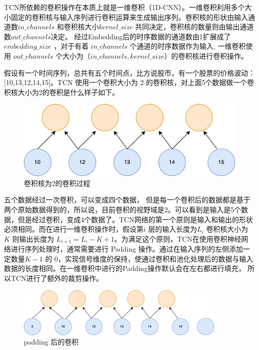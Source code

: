 TCN所依赖的卷积操作在本质上就是一维卷积（1D-CNN）。一维卷积利用多个大小固定的卷积核与输入序列进行卷积运算来生成输出序列。卷积核的形状由输入通道数$in\_channels$ 和卷积核大小$kernel\_size$ 共同决定，卷积核的数量则由输出通道数$out\_channels$决定。
经过Embedding后的时序数据的通道数由1扩展成了$embedding\_size$ ，对于有着 $in\_channels$ 个通道的时序数据作为输入, 一维卷积使用 $out\_channels$ 个大小为（$in\_channels, kernel\_size$）的卷积核进行卷积操作。

假设有一个时间序列，总共有五个时间点，比方说股市，有一个股票的价格波动：[10,13,12,14,15]。TCN 使用一个卷积大小为 2 的卷积核，对上面5个数据做一个卷积核大小为2的卷积是什么样子如下。

\begin{figure}[htbp]
  \centering
  \includegraphics[width=.9\textwidth]{figures/convolution_1.png}
  \caption{卷积核为2的卷积过程}
\end{figure}

五个数据经过一次卷积，可以变成四个数据，
但是每一个卷积后的数据都是基于两个原始数据得到的，所以说，目前卷积的视野域是2。可以看到是输入是5个数据，但是经过卷积，变成4个数据了。TCN网络的第一个原则是输入和输出的形状必须相同。而在进行一维卷积操作时，假设第$i$ 层的输入长度为$L_i$ 卷积核大小为 $K$ 则输出长度为 $L_{i+1} = L_{i} - K + 1$。为满足这个原则，TCN在使用卷积神经网络进行序列处理时，通常需要进行 Padding 操作。通过在输入序列的左侧添加一定数量$K-1$ 的 0，实现信号维度的保持，使通过卷积和池化处理后的数据与输入数据的长度相同。在一维卷积中进行的Padding操作默认会在左右都进行填充，
所以TCN进行了额外的裁剪操作。

\begin{figure}[htbp]
  \centering
  \includegraphics[width=0.9\textwidth]{figures/convolution_2.png}
  \caption{padding 后的卷积}
\end{figure}

